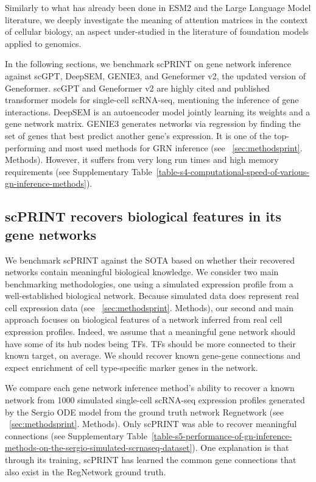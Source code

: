 Similarly to what has already been done in \gls{ESM}2 and the Large Language Model literature\citep{abnarQuantifyingAttentionFlow2020,clarkWhatDoesBERT2019a,bibalAttentionExplanationIntroduction2022}, we deeply investigate the meaning of attention matrices in the context of cellular biology, an aspect under-studied in the literature of foundation models applied to genomics. 

In the following sections, we benchmark \gls{scPRINT} on gene network inference against \gls{scGPT}, Deep\gls{SEM}\citep{shuModelingGeneRegulatory2021}, GENIE3\citep{huynh-thuInferringRegulatoryNetworks2010}, and Geneformer v2\citep{chenQuantizedMultitaskLearning2024}, the updated version of Geneformer. \gls{scGPT} and Geneformer v2 are highly cited and published transformer models for single-cell \gls{scRNA-seq}, mentioning the inference of gene interactions\citep{cuiScGPTBuildingFoundation2024}. Deep\gls{SEM} is an autoencoder model jointly learning its weights and a gene network matrix. GENIE3 generates networks via regression by finding the set of genes that best predict another gene's expression. It is one of the top-performing and most used methods for \gls{GRN} inference (see ~\ref{sec:methodsprint}. Methods). However, it suffers from very long run times and high memory requirements (see Supplementary Table~\ref{table-s4-computational-speed-of-various-gn-inference-methods}).

\subsection{scPRINT recovers biological features in its gene networks}

We benchmark \gls{scPRINT} against the \gls{SOTA} based on whether their recovered networks contain meaningful biological knowledge. We consider two main benchmarking methodologies, one using a simulated expression profile from a well-established biological network. Because simulated data does represent real cell expression data (see ~\ref{sec:methodsprint}. Methods), our second and main approach focuses on biological features of a network inferred from real cell expression profiles. Indeed, we assume that a meaningful gene network should have some of its hub nodes being \gls{TF}s. \gls{TF}s should be more connected to their known target, on average. We should recover known gene-gene connections and expect enrichment of cell type-specific marker genes in the network.

We compare each gene network inference method's ability to recover a known network from 1000 simulated single-cell \gls{scRNA-seq} expression profiles generated by the Sergio \gls{ODE} model\citep{dibaeiniaSERGIOSingleCellExpression2020} from the ground truth network Regnetwork\citep{liuRegNetworkIntegratedDatabase2015} (see ~\ref{sec:methodsprint}. Methods). Only \gls{scPRINT} was able to recover meaningful connections (see Supplementary Table~\ref{table-s5-performance-of-gn-inference-methods-on-the-sergio-simulated-scrnaseq-dataset}). One explanation is that through its training, \gls{scPRINT} has learned the common gene connections that also exist in the RegNetwork ground truth.

